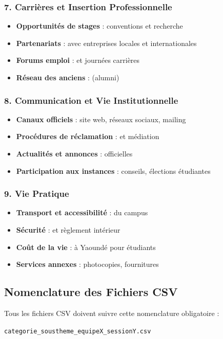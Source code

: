 \documentclass[11pt,a4paper]{article}
\begin{document}
\subsubsection{7. Carrières et Insertion Professionnelle}
\begin{itemize}
    \item \textbf{Opportunités de stages} : conventions et recherche
    \item \textbf{Partenariats} : avec entreprises locales et internationales
    \item \textbf{Forums emploi} : et journées carrières
    \item \textbf{Réseau des anciens} : (alumni)
\end{itemize}

\subsubsection{8. Communication et Vie Institutionnelle}
\begin{itemize}
    \item \textbf{Canaux officiels} : site web, réseaux sociaux, mailing
    \item \textbf{Procédures de réclamation} : et médiation
    \item \textbf{Actualités et annonces} : officielles
    \item \textbf{Participation aux instances} : conseils, élections étudiantes
\end{itemize}

\subsubsection{9. Vie Pratique}
\begin{itemize}
    \item \textbf{Transport et accessibilité} : du campus
    \item \textbf{Sécurité} : et règlement intérieur
    \item \textbf{Coût de la vie} : à Yaoundé pour étudiants
    \item \textbf{Services annexes} : photocopies, fournitures
\end{itemize}

\subsection{Nomenclature des Fichiers CSV}
\begin{important}
Tous les fichiers CSV doivent suivre cette nomenclature obligatoire :
\begin{center}
\texttt{categorie\_soustheme\_equipeX\_sessionY.csv}
\end{center}
\end{important}
\end{document}
